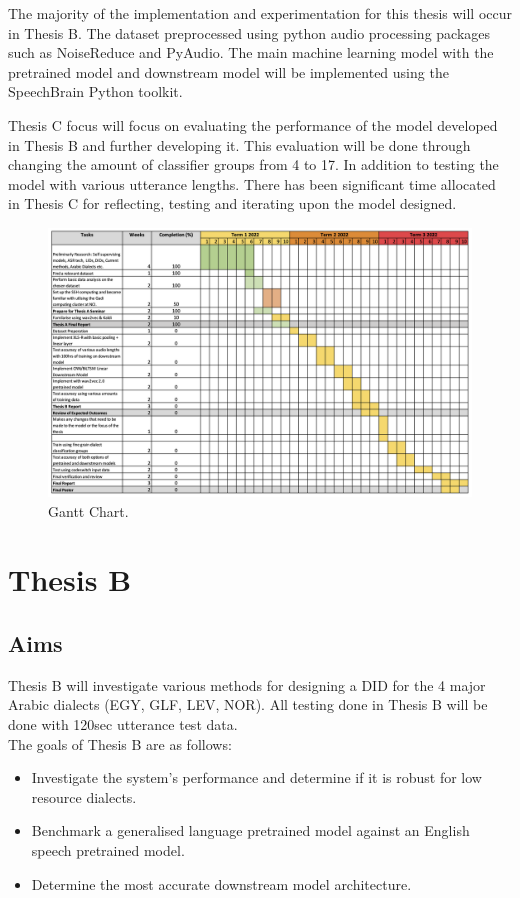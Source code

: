 The majority of the implementation and experimentation for this thesis will occur in 
Thesis B. The dataset preprocessed using python audio processing packages such as NoiseReduce and PyAudio. 
The main machine learning model with the pretrained model and downstream model will be implemented
using the SpeechBrain Python toolkit.

Thesis C focus will focus on evaluating the performance of the model developed in Thesis B and further 
developing it. This evaluation will be done through changing the amount of classifier groups from 4 to 17. 
In addition to testing the model with various utterance lengths. There has been significant time allocated in 
Thesis C for reflecting, testing and iterating upon the model designed. 

\begin{figure}[h]
    \centering
    \includegraphics[width=\textwidth]{images/timeline.png}
    \caption{Gantt Chart.}\label{Gantt Chart}
\end{figure}
\section{Thesis B}
\subsection{Aims}
Thesis B will investigate various methods for designing a DID for the 4 major
Arabic dialects (EGY, GLF, LEV, NOR). All testing done in Thesis B will be done with 
120sec utterance test data.\\
The goals of Thesis B are as follows: 
\begin{itemize}
    \item Investigate the system's performance and determine if it is robust for low resource dialects. 
    \item Benchmark a generalised language pretrained model against an English speech pretrained model.
    \item Determine the most accurate downstream model architecture. 
\end{itemize}

